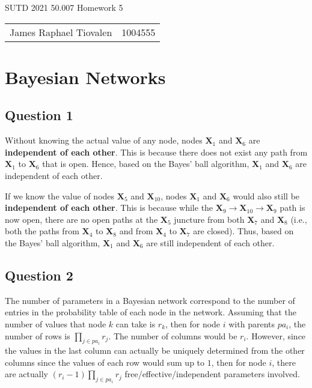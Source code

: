 \documentclass[11pt,fancychapters]{article}
\begin{document}
\centerline{\huge{SUTD 2021 50.007 Homework 5}}

\begin{table}[ht]
\centering
\footnotesize
 \begin{tabular}{c c} 
James Raphael Tiovalen & 1004555
 \end{tabular}
\end{table}

\section*{Bayesian Networks}

\subsection*{Question 1}

Without knowing the actual value of any node, nodes $\mathbf{X}_1$ and $\mathbf{X}_6$ are \textbf{independent of each other}. This is because there does not exist any path from $\mathbf{X}_1$ to $\mathbf{X}_6$ that is open. Hence, based on the Bayes' ball algorithm, $\mathbf{X}_1$ and $\mathbf{X}_6$ are independent of each other.

If we know the value of nodes $\mathbf{X}_5$ and $\mathbf{X}_{10}$, nodes $\mathbf{X}_1$ and $\mathbf{X}_6$ would also still be \textbf{independent of each other}. This is because while the $\mathbf{X}_9 \rightarrow \mathbf{X}_{10} \rightarrow \mathbf{X}_9$ path is now open, there are no open paths at the $\mathbf{X}_5$ juncture from both $\mathbf{X}_7$ and $\mathbf{X}_8$ (i.e., both the paths from $\mathbf{X}_4$ to $\mathbf{X}_8$ and from $\mathbf{X}_4$ to $\mathbf{X}_7$ are closed). Thus, based on the Bayes' ball algorithm, $\mathbf{X}_1$ and $\mathbf{X}_6$ are still independent of each other.

\subsection*{Question 2}

The number of parameters in a Bayesian network correspond to the number of entries in the probability table of each node in the network. Assuming that the number of values that node $k$ can take is $r_k$, then for node $i$ with parents $pa_i$, the number of rows is $\prod_{j \in pa_i} r_j$. The number of columns would be $r_i$. However, since the values in the last column can actually be uniquely determined from the other columns since the values of each row would sum up to $1$, then for node $i$, there are actually $(r_i - 1) \prod_{j \in pa_i} r_j$ free/effective/independent parameters involved.
\end{document}
